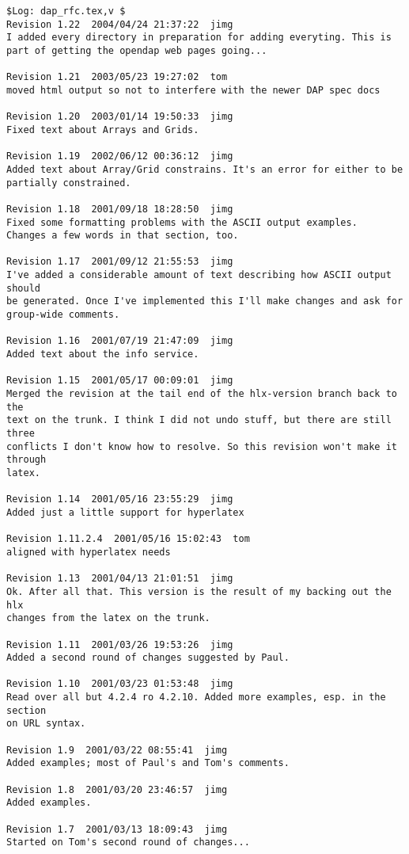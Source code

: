 \documentclass{article}
\begin{document}
\begin{verbatim}
$Log: dap_rfc.tex,v $
Revision 1.22  2004/04/24 21:37:22  jimg
I added every directory in preparation for adding everyting. This is
part of getting the opendap web pages going...

Revision 1.21  2003/05/23 19:27:02  tom
moved html output so not to interfere with the newer DAP spec docs

Revision 1.20  2003/01/14 19:50:33  jimg
Fixed text about Arrays and Grids.

Revision 1.19  2002/06/12 00:36:12  jimg
Added text about Array/Grid constrains. It's an error for either to be
partially constrained.

Revision 1.18  2001/09/18 18:28:50  jimg
Fixed some formatting problems with the ASCII output examples.
Changes a few words in that section, too.

Revision 1.17  2001/09/12 21:55:53  jimg
I've added a considerable amount of text describing how ASCII output should
be generated. Once I've implemented this I'll make changes and ask for
group-wide comments.

Revision 1.16  2001/07/19 21:47:09  jimg
Added text about the info service.

Revision 1.15  2001/05/17 00:09:01  jimg
Merged the revision at the tail end of the hlx-version branch back to the
text on the trunk. I think I did not undo stuff, but there are still three
conflicts I don't know how to resolve. So this revision won't make it through
latex.

Revision 1.14  2001/05/16 23:55:29  jimg
Added just a little support for hyperlatex

Revision 1.11.2.4  2001/05/16 15:02:43  tom
aligned with hyperlatex needs

Revision 1.13  2001/04/13 21:01:51  jimg
Ok. After all that. This version is the result of my backing out the hlx
changes from the latex on the trunk.

Revision 1.11  2001/03/26 19:53:26  jimg
Added a second round of changes suggested by Paul.

Revision 1.10  2001/03/23 01:53:48  jimg
Read over all but 4.2.4 ro 4.2.10. Added more examples, esp. in the section
on URL syntax.

Revision 1.9  2001/03/22 08:55:41  jimg
Added examples; most of Paul's and Tom's comments.

Revision 1.8  2001/03/20 23:46:57  jimg
Added examples.

Revision 1.7  2001/03/13 18:09:43  jimg
Started on Tom's second round of changes...


\end{verbatim}
\end{document}
